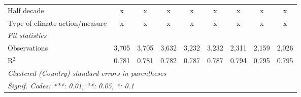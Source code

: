 \begin{tabular}{lcccccccc}
   Half decade                                               & x             & x             & x             & x              & x              & x              & x              & x\\  
   Type of climate action/measure                            & x             & x             & x             & x              & x              & x              & x              & x\\  
   \midrule \emph{Fit statistics}\\
   Observations                                              & 3,705         & 3,705         & 3,632         & 3,232          & 3,232          & 2,311          & 2,159          & 2,026\\  
   R$^2$                                                     & 0.781         & 0.781         & 0.782         & 0.787          & 0.787          & 0.794          & 0.795          & 0.795\\  
   \midrule
   \multicolumn{9}{l}{\emph{Clustered (Country) standard-errors in parentheses}}\\
   \multicolumn{9}{l}{\emph{Signif. Codes: ***: 0.01, **: 0.05, *: 0.1}}\\
\end{tabular}
\par\endgroup


